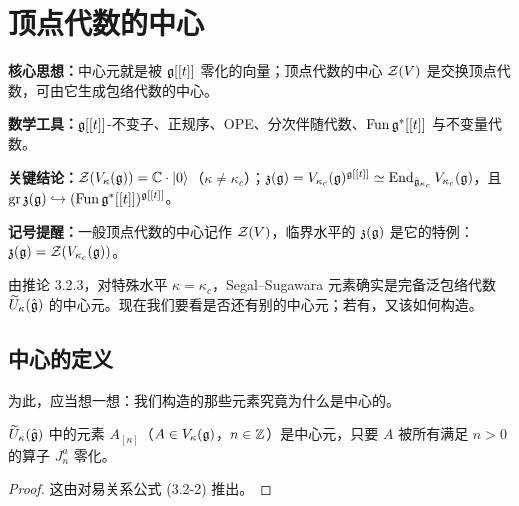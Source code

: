 \section{顶点代数的中心}

\begin{keypoints}
    \item \textbf{核心思想：}中心元就是被 $\mathfrak{g}[[t]]$ 零化的向量；顶点代数的中心 $\mathcal{Z}(V)$ 是交换顶点代数，可由它生成包络代数的中心。
    \item \textbf{数学工具：}$\mathfrak{g}[[t]]$-不变子、正规序、OPE、分次伴随代数、$\operatorname{Fun}\mathfrak{g}^*[[t]]$ 与不变量代数。
    \item \textbf{关键结论：}$\mathcal{Z}(V_\kappa(\mathfrak{g}))=\mathbb{C}\cdot|0\rangle$（$\kappa\neq\kappa_c$）；$\mathfrak z(\mathfrak{g})=V_{\kappa_c}(\mathfrak{g})^{\mathfrak{g}[[t]]}\simeq\operatorname{End}_{\hat{\mathfrak{g}}_{\kappa_c}}V_{\kappa_c}(\mathfrak{g})$，且 $\operatorname{gr}\mathfrak z(\mathfrak{g})\hookrightarrow(\operatorname{Fun}\mathfrak{g}^*[[t]])^{\mathfrak{g}[[t]]}$。
    \item \textbf{记号提醒：}一般顶点代数的中心记作 $\mathcal{Z}(V)$，临界水平的 $\mathfrak z(\mathfrak{g})$ 是它的特例：$\mathfrak z(\mathfrak{g})=\mathcal{Z}(V_{\kappa_c}(\mathfrak{g}))$。
\end{keypoints}

由推论 3.2.3，对特殊水平 $\kappa=\kappa_c$，Segal--Sugawara 元素确实是完备泛包络代数 $\widetilde U_\kappa(\hat{\mathfrak{g}})$ 的中心元。现在我们要看是否还有别的中心元；若有，又该如何构造。

\subsection{中心的定义}

为此，应当想一想：我们构造的那些元素究竟为什么是中心的。

\begin{lemma}
    $\widetilde U_\kappa(\hat{\mathfrak{g}})$ 中的元素 $A_{[n]}$（$A\in V_\kappa(\mathfrak{g})$，$n\in\mathbb{Z}$）是中心元，只要 $A$ 被所有满足 $n>0$ 的算子 $J^a_n$ 零化。
\end{lemma}

\begin{proof}
    这由对易关系公式 (3.2-2) 推出。
\end{proof}

